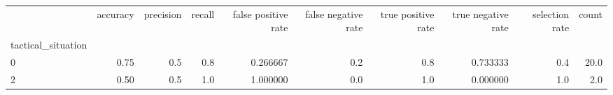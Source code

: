 \begin{tabular}{lrrrrrrrrr}
\toprule
{} &  accuracy &  precision &  recall &  false positive rate &  false negative rate &  true positive rate &  true negative rate &  selection rate &  count \\
tactical\_situation &           &            &         &                      &                      &                     &                     &                 &        \\
\midrule
0                  &      0.75 &        0.5 &     0.8 &             0.266667 &                  0.2 &                 0.8 &            0.733333 &             0.4 &   20.0 \\
2                  &      0.50 &        0.5 &     1.0 &             1.000000 &                  0.0 &                 1.0 &            0.000000 &             1.0 &    2.0 \\
\bottomrule
\end{tabular}
